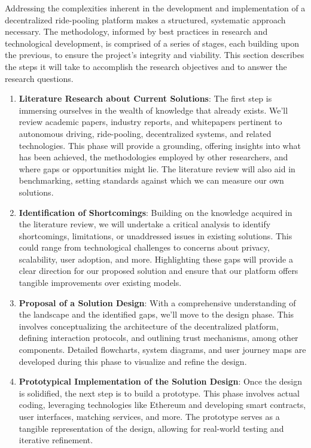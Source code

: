 Addressing the complexities inherent in the development and implementation of a decentralized ride-pooling platform makes a structured, systematic approach necessary. The methodology, informed by best practices in research and technological development, is comprised of a series of stages, each building upon the previous, to ensure the project's integrity and viability. This section describes the steps it will take to accomplish the research objectives and to answer the research questions.

\begin{enumerate}
    \item \textbf{Literature Research about Current Solutions}: 
    The first step is immersing ourselves in the wealth of knowledge that already exists. We'll review academic papers, industry reports, and whitepapers pertinent to autonomous driving, ride-pooling, decentralized systems, and related technologies. This phase will provide a grounding, offering insights into what has been achieved, the methodologies employed by other researchers, and where gaps or opportunities might lie. The literature review will also aid in benchmarking, setting standards against which we can measure our own solutions.

    \item \textbf{Identification of Shortcomings}: 
    Building on the knowledge acquired in the literature review, we will undertake a critical analysis to identify shortcomings, limitations, or unaddressed issues in existing solutions. This could range from technological challenges to concerns about privacy, scalability, user adoption, and more. Highlighting these gaps will provide a clear direction for our proposed solution and ensure that our platform offers tangible improvements over existing models.

    \item \textbf{Proposal of a Solution Design}:
    With a comprehensive understanding of the landscape and the identified gaps, we'll move to the design phase. This involves conceptualizing the architecture of the decentralized platform, defining interaction protocols, and outlining trust mechanisms, among other components. Detailed flowcharts, system diagrams, and user journey maps are developed during this phase to visualize and refine the design.

    \item \textbf{Prototypical Implementation of the Solution Design}: 
    Once the design is solidified, the next step is to build a prototype. This phase involves actual coding, leveraging technologies like Ethereum and developing smart contracts, user interfaces, matching services, and more. The prototype serves as a tangible representation of the design, allowing for real-world testing and iterative refinement.


\end{enumerate}
